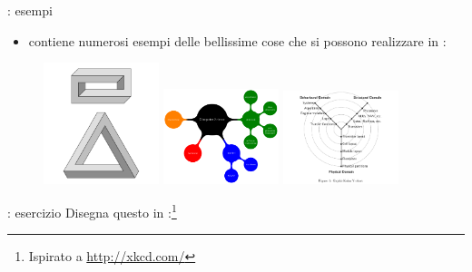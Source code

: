 \documentclass{beamer}
\begin{document}
\begin{frame}[fragile]{\insertsection: esempi}
\begin{itemize}
\item {} contiene numerosi esempi delle bellissime cose che si possono realizzare in \tikzname{}:
\end{itemize}
\begin{figure}
\href{http://texample.net/tikz/examples/escher-brick-penrose-triangle/}{%
  \includegraphics[width=0.3\textwidth]{escher-brick-penrose-triangle}}
\href{http://texample.net/tikz/examples/computer-science-mindmap/}{%
  \includegraphics[width=0.3\textwidth]{computer-science-mindmap}}
\href{http://texample.net/tikz/examples/gajski-kuhn-y-chart/}{%
  \includegraphics[width=0.3\textwidth]{gajski-kuhn-y-chart}}
\end{figure}
\end{frame}

\begin{frame}[fragile]{\insertsection: esercizio}
Disegna questo in \tikzname:\footnote{Ispirato a \url{http://xkcd.com/}}
\begin{figure}

\end{figure}
\end{frame}
\end{document}

